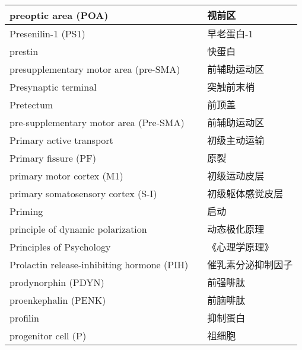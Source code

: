 \begin{longtable}{lll}
	\midrule
	preoptic area (POA)     && 	视前区   \\
	
	\midrule
	Presenilin-1 (PS1)     && 	早老蛋白-1   \\
	
	\midrule
	prestin     && 	快蛋白   \\
	
	\midrule
	presupplementary motor area (pre-SMA)    && 	前辅助运动区   \\
	
	\midrule
	Presynaptic terminal     && 	突触前末梢   \\
	
	\midrule
	Pretectum     && 	前顶盖   \\
	
	\midrule
	pre-supplementary motor area (Pre-SMA)     && 	前辅助运动区   \\
	
	\midrule
	Primary active transport   && 初级主动运输  \\
	
	\midrule
	Primary fissure (PF)   && 原裂  \\
	
	\midrule
	primary motor cortex (M1)   && 初级运动皮层  \\
	
	\midrule
	primary somatosensory cortex (S-I)   && 初级躯体感觉皮层  \\
	
	\midrule
	Priming   && 启动  \\
	
	\midrule
	principle of dynamic polarization   && 动态极化原理  \\
	
	\midrule
	Principles of Psychology   && 《心理学原理》  \\
	
	\midrule
	Prolactin release-inhibiting hormone (PIH)  && 催乳素分泌抑制因子  \\
	
	\midrule
	prodynorphin (PDYN)  && 前强啡肽  \\
	
	\midrule
	proenkephalin (PENK)  && 前脑啡肽  \\
	
	\midrule
	profilin  && 抑制蛋白  \\
	
	\midrule
	progenitor cell (P)   && 祖细胞  \\
	

\end{longtable}
